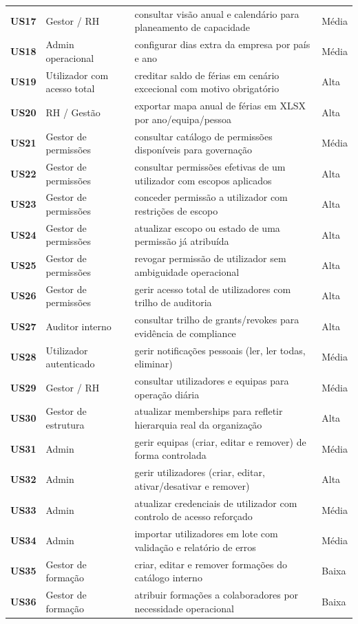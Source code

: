 \documentclass[11pt,a4paper,twoside]{article}
\begin{document}
\begin{longtable}{>{\small\centering\arraybackslash\bfseries}p{1.0cm} >{\small}p{3.7cm} >{\small}p{6.8cm} >{\small\centering\arraybackslash}p{1.6cm}}
US17 & Gestor / RH & consultar visão anual e calendário para planeamento de capacidade & Média \\
US18 & Admin operacional & configurar dias extra da empresa por país e ano & Média \\
US19 & Utilizador com acesso total & creditar saldo de férias em cenário excecional com motivo obrigatório & Alta \\
US20 & RH / Gestão & exportar mapa anual de férias em XLSX por ano/equipa/pessoa & Alta \\
US21 & Gestor de permissões & consultar catálogo de permissões disponíveis para governação & Média \\
US22 & Gestor de permissões & consultar permissões efetivas de um utilizador com escopos aplicados & Alta \\
US23 & Gestor de permissões & conceder permissão a utilizador com restrições de escopo & Alta \\
US24 & Gestor de permissões & atualizar escopo ou estado de uma permissão já atribuída & Alta \\
US25 & Gestor de permissões & revogar permissão de utilizador sem ambiguidade operacional & Alta \\
US26 & Gestor de permissões & gerir acesso total de utilizadores com trilho de auditoria & Alta \\
US27 & Auditor interno & consultar trilho de grants/revokes para evidência de compliance & Alta \\
US28 & Utilizador autenticado & gerir notificações pessoais (ler, ler todas, eliminar) & Média \\
US29 & Gestor / RH & consultar utilizadores e equipas para operação diária & Média \\
US30 & Gestor de estrutura & atualizar memberships para refletir hierarquia real da organização & Alta \\
US31 & Admin & gerir equipas (criar, editar e remover) de forma controlada & Média \\
US32 & Admin & gerir utilizadores (criar, editar, ativar/desativar e remover) & Alta \\
US33 & Admin & atualizar credenciais de utilizador com controlo de acesso reforçado & Média \\
US34 & Admin & importar utilizadores em lote com validação e relatório de erros & Média \\
US35 & Gestor de formação & criar, editar e remover formações do catálogo interno & Baixa \\
US36 & Gestor de formação & atribuir formações a colaboradores por necessidade operacional & Baixa \\

\end{longtable}
\end{document}
